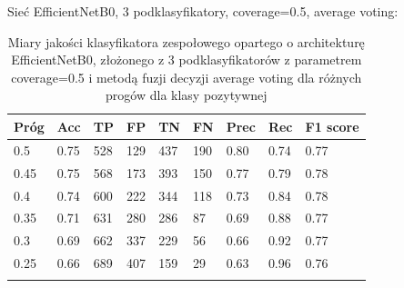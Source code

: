 \documentclass[polish,12pt]{aghthesis}
\begin{document}
\vspace{3.5mm}
\par\noindent Sieć EfficientNetB0, 3 podklasyfikatory, coverage=0.5, average voting:
\renewcommand{\arraystretch}{1.7}
 \begin{longtable}[h!]{|m{2.0cm}|m{1.2cm}|m{1.2cm}|m{1.2cm}|m{1.2cm}|m{1.2cm}|m{1.2cm}|m{1.2cm}|m{1.6cm}|}
 \hline
 Próg & Acc & TP & FP & TN & FN & Prec & Rec & F1 score\\
 \hline
 0.5 & 0.75 & 528 & 129 & 437 & 190 & 0.80 & 0.74 & 0.77\\
 \hline
 0.45 & 0.75 & 568 & 173 & 393 & 150 & 0.77 & 0.79 & 0.78\\
 \hline
 0.4 & 0.74 & 600 & 222 & 344 & 118 & 0.73 & 0.84 & 0.78\\
 \hline
 0.35 & 0.71 & 631 & 280 & 286 & 87 & 0.69 & 0.88 & 0.77\\
 \hline
 0.3 & 0.69 & 662 & 337 & 229 & 56 & 0.66 & 0.92 & 0.77\\
 \hline
 0.25 & 0.66 & 689 & 407 & 159 & 29 & 0.63 & 0.96 & 0.76\\
 \hline
\caption{Miary jakości klasyfikatora zespołowego opartego o architekturę EfficientNetB0, złożonego z 3 podklasyfikatorów z parametrem coverage=0.5 i metodą fuzji decyzji average voting dla różnych progów dla klasy pozytywnej}
\label{table:37}
\end{longtable}
\end{document}
